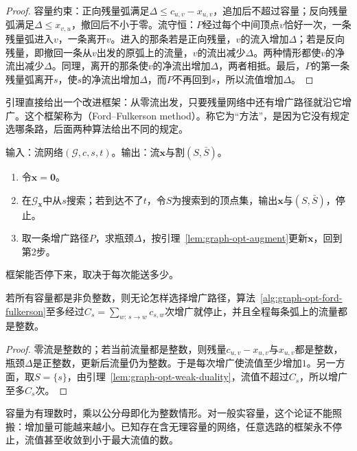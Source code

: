 \begin{proof}
容量约束：正向残量弧满足$\Delta\leq c_{u,v}-x_{u,v}$，追加后不超过容量；反向残量弧满足$\Delta\leq x_{v,u}$，撤回后不小于零。流守恒：$P$经过每个中间顶点$v$恰好一次，一条残量弧进入$v$，一条离开$v$。进入的那条若是正向残量，$v$的流入增加$\Delta$；若是反向残量，即撤回一条从$v$出发的原弧上的流量，$v$的流出减少$\Delta$。两种情形都使$v$的净流出减少$\Delta$。同理，离开的那条使$v$的净流出增加$\Delta$，两者相抵。最后，$P$的第一条残量弧离开$s$，使$s$的净流出增加$\Delta$，而$P$不再回到$s$，所以流值增加$\Delta$。
\end{proof}

引理直接给出一个改进框架：从零流出发，只要残量网络中还有增广路径就沿它增广。这个框架称为（Ford--Fulkerson method）。称它为“方法”，是因为它没有规定选哪条路，后面两种算法给出不同的规定。

\begin{algorithm}
\label{alg:graph-opt-ford-fulkerson}
输入：流网络$(\mathcal G,c,s,t)$。输出：流$\bm x$与割$(S,\bar S)$。
\begin{enumerate}
  \item 令$\bm x=\bm 0$。
  \item 在$\mathcal G_{\bm x}$中从$s$搜索；若到达不了$t$，令$S$为搜索到的顶点集，输出$\bm x$与$(S,\bar S)$，停止。
  \item 取一条增广路径$P$，求瓶颈$\Delta$，按引理~\ref{lem:graph-opt-augment}更新$\bm x$，回到第2步。
\end{enumerate}
\end{algorithm}

框架能否停下来，取决于每次能送多少。

\begin{theorem}[整数容量下的有限终止]
\label{thm:graph-opt-integer-termination}
若所有容量都是非负整数，则无论怎样选择增广路径，算法~\ref{alg:graph-opt-ford-fulkerson}至多经过$C_s=\sum_{w:\,s\to w}c_{s,w}$次增广就停止，并且全程每条弧上的流量都是整数。
\end{theorem}

\begin{proof}
零流是整数的；若当前流量都是整数，则残量$c_{u,v}-x_{u,v}$与$x_{u,v}$都是整数，瓶颈$\Delta$是正整数，更新后流量仍为整数。于是每次增广使流值至少增加$1$。另一方面，取$S=\{s\}$，由引理~\ref{lem:graph-opt-weak-duality}，流值不超过$C_s$，所以增广至多$C_s$次。
\end{proof}

容量为有理数时，乘以公分母即化为整数情形。对一般实容量，这个论证不能照搬：增加量可能越来越小。已知存在含无理容量的网络，任意选路的框架永不停止，流值甚至收敛到小于最大流值的数。

